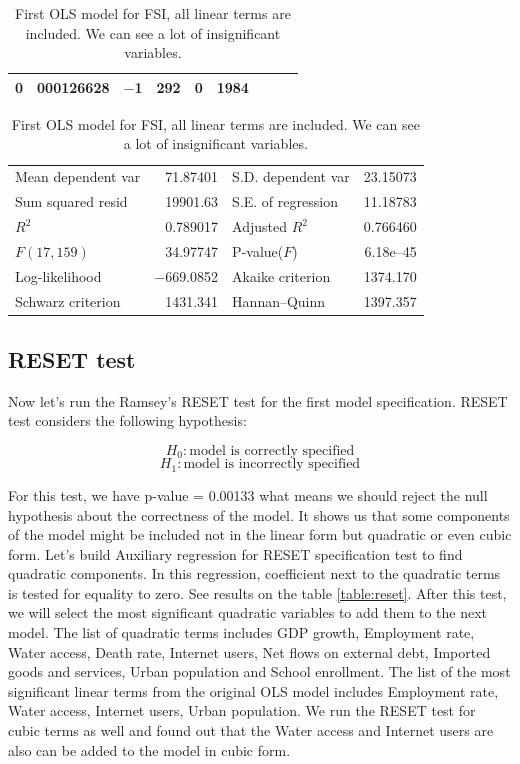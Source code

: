 \documentclass{article}
\begin{document}
\begin{table}[H]
\begin{center}
\begin{tabular}{lr@{.}lr@{.}lr@{.}lr@{.}l}
    0&000126628 &
      $-$1&292 &
        0&1984 \\
\toprule
\end{tabular}
\begin{tabular}{lrlr}
Mean dependent var &  71.87401 & S.D. dependent var &  23.15073 \\
Sum squared resid &  19901.63 & S.E. of regression &  11.18783 \\
$R^2$ &  0.789017 & Adjusted $R^2$ &  0.766460 \\
$F(17, 159)$ &  34.97747 & P-value($F$) &  6.18\textrm{e--45} \\
Log-likelihood & $-$669.0852 & Akaike criterion &  1374.170 \\
Schwarz criterion &  1431.341 & Hannan--Quinn &  1397.357 \\
\toprule
\end{tabular}
\end{center}
\caption{First OLS model for FSI, all linear terms are included. We can see a lot of insignificant variables.}
\label{table:ols}
\end{table}

\subsection{RESET test}
Now let's run the Ramsey’s RESET test for the first model specification. RESET test considers the following hypothesis:

$$H_0: \text{model is correctly specified}$$
$$H_1: \text{model is incorrectly specified}$$

For this test, we have p-value = 0.00133 what means we should reject the null hypothesis about the correctness of the model. It shows us that some components of the model might be included not in the linear form but quadratic or even cubic form. Let's build Auxiliary regression for RESET specification test to find quadratic components. In this regression, coefficient next to the quadratic terms is tested for equality to zero. See results on the table \ref{table:reset}. After this test, we will select the most significant quadratic variables to add them to the next model. The list of quadratic terms includes GDP growth, Employment rate, Water access, Death rate, Internet users, Net flows on external debt, Imported goods and services, Urban population and School enrollment. The list of the most significant linear terms from the original OLS model includes Employment rate, Water access, Internet users,  Urban population. We run the RESET test for cubic terms as well and found out that the Water access and Internet users are also can be added to the model in cubic form. \\
\end{document}
